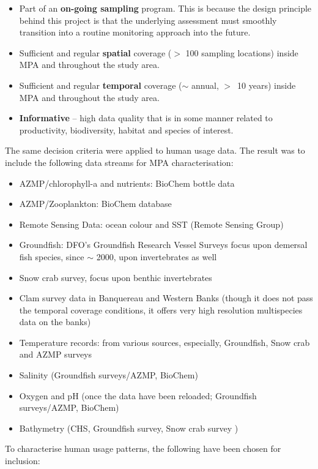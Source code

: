 \documentclass[letterpaper,portrait,11pt]{scrartcl}
\numberwithin{equation}{section}    %
\numberwithin{figure}{section}    %
\numberwithin{table}{section}       %
\begin{document}
\begin{itemize}
	\item Part of an \textbf{on-going sampling} program. This is because the design principle behind this project is that the underlying assessment must smoothly transition into a routine monitoring approach into the future.
  \item	Sufficient and regular \textbf{spatial} coverage ($>$ 100 sampling locations) inside MPA and throughout the study area.
  \item Sufficient and regular \textbf{temporal} coverage ($\sim$ annual, $>$~10 years) inside MPA and throughout the study area.
  \item \textbf{Informative} -- high data quality that is in some manner related to productivity, biodiversity, habitat and species of interest.
\end{itemize}

The same decision criteria were applied to human usage data. The result was to include the following data streams for MPA characterisation:

\begin{itemize}
  \item AZMP/chlorophyll-a and nutrients: BioChem bottle data  \parencite{DFO:2014:biochem}
  \item AZMP/Zooplankton: BioChem database \parencite{DFO:2014:biochem}
  \item Remote Sensing Data: ocean colour and SST (Remote Sensing Group)
  \item Groundfish: DFO's Groundfish Research Vessel Surveys focus upon demersal fish species, since $\sim$ 2000, upon invertebrates as well
  \item Snow crab survey, focus upon benthic invertebrates
  \item Clam survey data in Banquereau and Western Banks (though it does not pass the temporal coverage conditions, it offers very high resolution multispecies data on the banks)
  \item Temperature records: from various sources, especially, Groundfish, Snow crab and AZMP surveys
  \item Salinity (Groundfish surveys/AZMP, BioChem)
  \item Oxygen and pH (once the data have been reloaded; Groundfish surveys/AZMP, BioChem)
  \item Bathymetry (CHS, Groundfish survey, Snow crab survey )
\end{itemize}

To characterise human usage patterns, the following have been chosen for inclusion:
\end{document}
